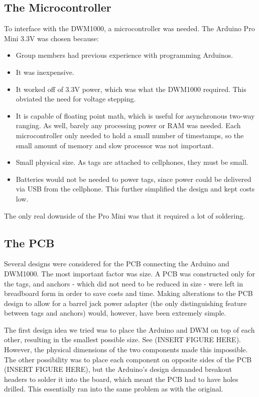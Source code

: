 \subsection{The Microcontroller}
To interface with the DWM1000, a microcontroller was needed. The Arduino Pro Mini 3.3V was chosen because:
\begin{itemize}
	\item Group members had previous experience with programming Arduinos.
	\item It was inexpensive.
	\item It worked off of 3.3V power, which was what the DWM1000 required. This obviated the need for voltage stepping.
	\item It is capable of floating point math, which is useful for asynchronous two-way ranging. As well, barely any processing power or RAM was needed. Each microcontroller only needed to hold a small number of timestamps, so the small amount of memory and slow processor was not important.
	\item Small physical size. As tags are attached to cellphones, they must be small.
	\item Batteries would not be needed to power tags, since power could be delivered via USB from the cellphone. This further simplified the design and kept costs low.
\end{itemize}

The only real downside of the Pro Mini was that it required a lot of soldering. 

\subsection{The PCB}
Several designs were considered for the PCB connecting the Arduino and DWM1000. The most important factor was size. A PCB was constructed only for the tags, and anchors - which did not need to be reduced in size - were left in breadboard form in order to save costs and time. Making alterations to the PCB design to allow for a barrel jack power adapter (the only distinguishing feature between tags and anchors) would, however, have been extremely simple.

The first design idea we tried was to place the Arduino and DWM on top of each other, resulting in the smallest possible size. See (INSERT FIGURE HERE). However, the physical dimensions of the two components made this impossible. The other possibility was to place each component on opposite sides of the PCB (INSERT FIGURE HERE), but the Arduino's design demanded breakout headers to solder it into the board, which meant the PCB had to have holes drilled. This essentially ran into the same problem as with the original.

